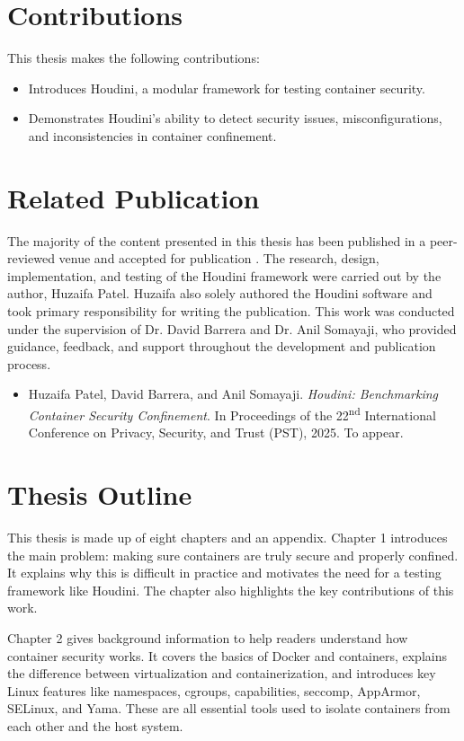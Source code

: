 \documentclass[12pt]{report}
\begin{document}
\begin{doublespace}
\section{Contributions}

This thesis makes the following contributions:
\begin{itemize}
    \item Introduces Houdini, a modular framework for testing container security.
    \item Demonstrates Houdini’s ability to detect security issues, misconfigurations, and inconsistencies in container confinement.
\end{itemize}

\section{Related Publication}

The majority of the content presented in this thesis has been published in a peer-reviewed venue and accepted for publication \cite{houdini}. The research, design, implementation, and testing of the Houdini framework were carried out by the author, Huzaifa Patel. Huzaifa also solely authored the Houdini software and took primary responsibility for writing the publication. This work was conducted under the supervision of Dr. David Barrera and Dr. Anil Somayaji, who provided guidance, feedback, and support throughout the development and publication process.

\begin{itemize}
    \item Huzaifa Patel, David Barrera, and Anil Somayaji. \textit{Houdini: Benchmarking Container Security Confinement}. In Proceedings of the 22\textsuperscript{nd} International Conference on Privacy, Security, and Trust (PST), 2025. To appear.
\end{itemize}


\section{Thesis Outline}

This thesis is made up of eight chapters and an appendix. Chapter 1 introduces the main problem: making sure containers are truly secure and properly confined. It explains why this is difficult in practice and motivates the need for a testing framework like Houdini. The chapter also highlights the key contributions of this work.

Chapter 2 gives background information to help readers understand how container security works. It covers the basics of Docker and containers, explains the difference between virtualization and containerization, and introduces key Linux features like namespaces, cgroups, capabilities, seccomp, AppArmor, SELinux, and Yama. These are all essential tools used to isolate containers from each other and the host system.


\end{doublespace}
\end{document}
